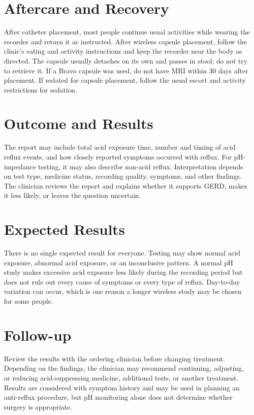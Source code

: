 \section*{Aftercare and Recovery}
After catheter placement, most people continue usual activities while wearing the recorder and return it as instructed. After wireless capsule placement, follow the clinic's eating and activity instructions and keep the recorder near the body as directed. The capsule usually detaches on its own and passes in stool; do not try to retrieve it. If a Bravo capsule was used, do not have MRI within 30 days after placement. If sedated for capsule placement, follow the usual escort and activity restrictions for sedation.

\section*{Outcome and Results}
The report may include total acid exposure time, number and timing of acid reflux events, and how closely reported symptoms occurred with reflux. For pH-impedance testing, it may also describe non-acid reflux. Interpretation depends on test type, medicine status, recording quality, symptoms, and other findings. The clinician reviews the report and explains whether it supports GERD, makes it less likely, or leaves the question uncertain.

\section*{Expected Results}
There is no single expected result for everyone. Testing may show normal acid exposure, abnormal acid exposure, or an inconclusive pattern. A normal pH study makes excessive acid exposure less likely during the recording period but does not rule out every cause of symptoms or every type of reflux. Day-to-day variation can occur, which is one reason a longer wireless study may be chosen for some people.

\section*{Follow-up}
Review the results with the ordering clinician before changing treatment. Depending on the findings, the clinician may recommend continuing, adjusting, or reducing acid-suppressing medicine, additional tests, or another treatment. Results are considered with symptom history and may be used in planning an anti-reflux procedure, but pH monitoring alone does not determine whether surgery is appropriate.


